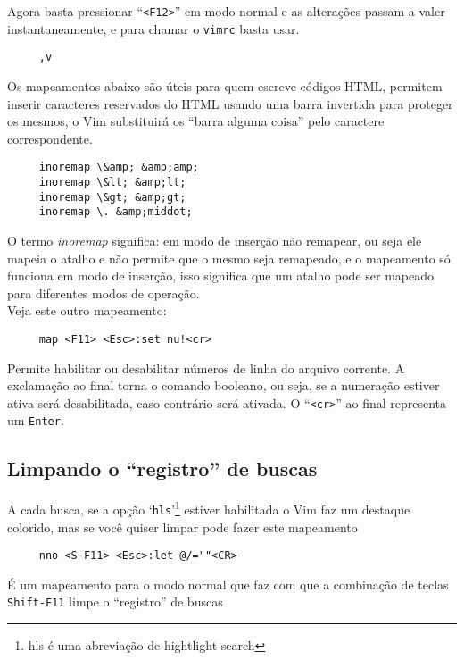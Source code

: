Agora basta pressionar ``\verb|<F12>|'' em modo normal e as alterações passam a valer
instantaneamente, e para chamar o {\tt vimrc} basta usar.

\begin{verbatim}
     ,v
\end{verbatim}

Os mapeamentos abaixo são úteis para quem escreve códigos HTML, permitem
inserir caracteres reservados do HTML usando uma barra invertida para proteger
os mesmos, o Vim substituirá os ``barra alguma coisa'' pelo caractere
correspondente.

\begin{verbatim}
     inoremap \&amp; &amp;amp;
     inoremap \&lt; &amp;lt;
     inoremap \&gt; &amp;gt;
     inoremap \. &amp;middot;
\end{verbatim}

O termo {\em inoremap} significa: em modo de inserção não remapear, ou seja
ele mapeia o atalho e não permite que o mesmo seja remapeado, e o
mapeamento só funciona em modo de inserção, isso significa que um atalho
pode ser mapeado para diferentes modos de operação. \\

Veja este outro mapeamento:

\begin{verbatim}
     map <F11> <Esc>:set nu!<cr>
\end{verbatim}

Permite habilitar ou desabilitar números de linha do arquivo corrente.
A exclamação ao final torna o comando booleano, ou seja, se a
numeração estiver ativa será desabilitada, caso contrário será
ativada. O ``\verb|<cr>|'' ao final representa um {\tt Enter}.

\subsection{Limpando o ``registro'' de buscas}\label{Limpando o ``registro'' de buscas}

A cada busca, se a opção `{\tt hls}'\footnote{hls é uma abreviação de hightlight search}
estiver habilitada o Vim faz um destaque colorido, mas se você quiser limpar pode fazer este
mapeamento

\begin{verbatim}
     nno <S-F11> <Esc>:let @/=""<CR>
\end{verbatim}

É um mapeamento para o modo normal que faz com que a combinação de
teclas \verb|Shift-F11| limpe o ``registro'' de buscas

